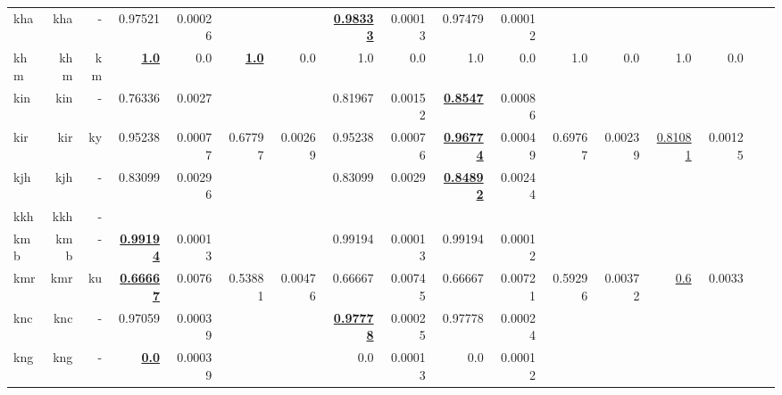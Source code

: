 \documentclass[11pt]{article}
\begin{document}
\begin{table*}[h]
{\begin{tabular}{lrrrrrrrrrrrrrrrr}
kha         & kha         & -         & 0.97521         & 0.00026         &          &          & \textbf{\underline{0.98333}}         & 0.00013         & 0.97479         & 0.00012         &          &          &          &          \\
khm         & khm         & km         & \textbf{\underline{1.0}}         & 0.0         & \textbf{\underline{1.0}}         & 0.0         & 1.0         & 0.0         & 1.0         & 0.0         & 1.0         & 0.0         & 1.0         & 0.0         \\
kin         & kin         & -         & 0.76336         & 0.0027         &          &          & 0.81967         & 0.00152         & \textbf{\underline{0.8547}}         & 0.00086         &          &          &          &          \\
kir         & kir         & ky         & 0.95238         & 0.00077         & 0.67797         & 0.00269         & 0.95238         & 0.00076         & \textbf{\underline{0.96774}}         & 0.00049         & 0.69767         & 0.00239         & \underline{0.81081}         & 0.00125         \\
kjh         & kjh         & -         & 0.83099         & 0.00296         &          &          & 0.83099         & 0.0029         & \textbf{\underline{0.84892}}         & 0.00244         &          &          &          &          \\
kkh         & kkh         & -         &          &          &          &          &          &          &          &          &          &          &          &          \\
kmb         & kmb         & -         & \textbf{\underline{0.99194}}         & 0.00013         &          &          & 0.99194         & 0.00013         & 0.99194         & 0.00012         &          &          &          &          \\
kmr         & kmr         & ku         & \textbf{\underline{0.66667}}         & 0.0076         & 0.53881         & 0.00476         & 0.66667         & 0.00745         & 0.66667         & 0.00721         & 0.59296         & 0.00372         & \underline{0.6}         & 0.0033         \\
knc         & knc         & -         & 0.97059         & 0.00039         &          &          & \textbf{\underline{0.97778}}         & 0.00025         & 0.97778         & 0.00024         &          &          &          &          \\
kng         & kng         & -         & \textbf{\underline{0.0}}         & 0.00039         &          &          & 0.0         & 0.00013         & 0.0         & 0.00012         &          &          &          &          \\

\end{tabular}}
\end{table*}
\end{document}
